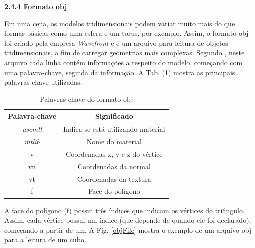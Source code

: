 \begin{description}
	\item \textbf{2.4.4 Formato obj}

	Em uma cena, os modelos tridimensionais podem variar muito mais do que formas básicas como uma esfera e um torus, por exemplo. Assim, o formato obj foi criado pela empresa  \textit{Wavefront} e é um arquivo para leitura de objetos tridimensionais, a fim de carregar geometrias mais complexas. Segundo \cite{graphicsprog}, neste arquivo cada linha contém informações a respeito do modelo, começando com uma palavra-chave, seguida da informação. A  Tab. (\ref{palavraschave}) mostra as principais palavras-chave utilizadas. 

\begin{table}[h]
	\centering	
	\begin{tabular}{cc}
		\toprule
		\textbf{Palavra-chave} & \textbf{Significado}  \\
		\midrule
		\textit{usemtl} & Indica se está utilizando material  \\
		\textit{mtlib} &  Nome do material \\
		v &  Coordenadas x, y e z do vértice \\
		vn & Coordenadas da normal \\
		vt &  Coordenadas da textura \\
		f &  Face do polígono \\
		\bottomrule
	\end{tabular}
	\caption{ Palavras-chave do formato obj}
	\label{palavraschave}
\end{table}

	A face do polígono (f) possui três índices que indicam os vértices do triângulo. Assim, cada vértice possui um índice (que depende de quando ele foi declarado), começando a partir de um. A Fig. \ref{objFile} mostra o exemplo de um arquivo obj para a leitura de um cubo. 


\end{description}
